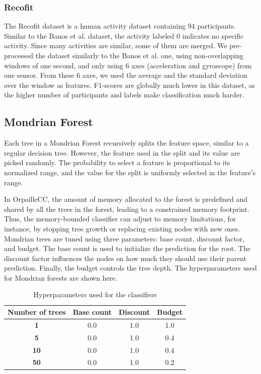 \documentclass[conference]{IEEEtran}
\begin{document}
\subsubsection{Recofit}
The Recofit \cite{morris2014recofit} dataset is a human activity dataset containing 94 participants. Similar to the Banos et al. dataset, the activity labeled 0 indicates no specific activity. Since many activities are similar, some of them are merged. We pre-processed the dataset similarly to the Banos et al. one, using non-overlapping windows of one second, and only using 6 axes (acceleration and gyroscope) from one sensor. From these 6 axes, we used the average and the standard deviation over the window as features. F1-scores are globally much lower in this dataset, as the higher number of participants and labels make classification much harder.
\subsection{Mondrian Forest}
Each tree in a Mondrian Forest recursively splits the feature space, similar to a regular decision tree. However, the feature used in the split and its value are picked randomly. The probability to select a feature is proportional to its normalized range, and the value for the split is uniformly selected in the feature's range. \par
In OrpailleCC, the amount of memory allocated to the forest is predefined and shared by all the trees in the forest, leading to a constrained memory footprint. Thus, the memory-bounded classifier can adjust to memory limitations, for instance, by stopping tree growth or replacing existing nodes with new ones. Mondrian trees are tuned using three parameters: base count, discount factor, and budget. The base count is used to initialize the prediction for the root. The discount factor influences the nodes on how much they should use their parent prediction. \cite{khannouz2020benchmark} Finally, the budget controls the tree depth. The hyperparameters used for Mondrian forests are shown here. 
\begin{table}[htbp]
\caption{Hyperparameters used for the classifiers}
\begin{center}
\begin{tabular}{|c|c|c|c|}
\hline
\textbf{Number of trees} & \textbf{Base count}& \textbf{Discount}& \textbf{Budget} \\
\hline
\textbf{1} & 0.0 & 1.0 & 1.0\\
\textbf{5} & 0.0 & 1.0 & 0.4\\
\textbf{10} & 0.0 & 1.0 & 0.4\\
\textbf{50} & 0.0 & 1.0 & 0.2\\
\hline
\end{tabular}
\label{tab1}
\end{center}
\end{table}
\end{document}
